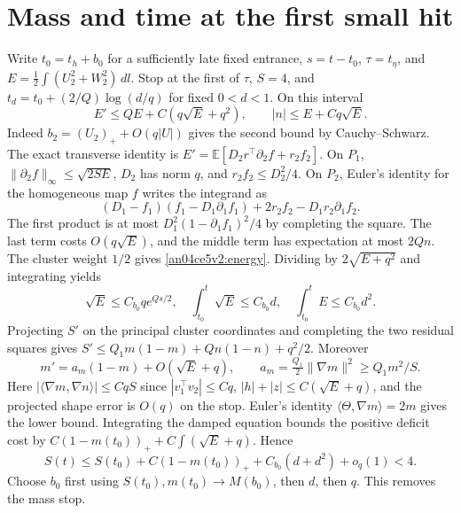 \documentclass[11pt]{article}
\newcommand{\dd}{\,dl}
\newcommand{\E}{\mathbb E}
\begin{document}
\section{Mass and time at the first small hit}\label{an04ce5v2:mass}
Write $t_0=t_h+b_0$ for a sufficiently late fixed entrance, $s=t-t_0$,
$\tau=t_\eta$, and $E=\tfrac12\int (U_2^2+W_2^2)\dd$. Stop at the first of
$\tau$, $S=4$, and $t_d=t_0+(2/Q)\log(d/q)$ for fixed $0<d<1$.
On this interval
\begin{equation}\label{an04ce5v2:energy}
 E'\le QE+C(q\sqrt E+q^2),\qquad |n|\le E+Cq\sqrt E .
\end{equation}
Indeed $b_2=(U_2)_++O(q|U|)$ gives the second bound by Cauchy--Schwarz.
The exact transverse identity is $E'=\E[D_2r^\top\partial_2 f+r_2 f_2]$.
On $P_1$, $\|\partial_2 f\|_\infty\le\sqrt{2SE}$, $D_2$ has norm $q$, and $r_2 f_2\le D_2^2/4$. On $P_2$, Euler's identity for the homogeneous map $f$ writes the integrand as
\[
 (D_1-f_1)(f_1-D_1\partial_1 f_1)+2r_2 f_2-D_1r_2\partial_1 f_2.
\]
The first product is at most $D_1^2(1-\partial_1 f_1)^2/4$ by completing the square. The last term costs $O(q\sqrt E)$, and the middle term has expectation at most $2Qn$. The cluster weight $1/2$ gives \eqref{an04ce5v2:energy}. Dividing by $2\sqrt{E+q^2}$ and integrating yields
\begin{equation}\label{an04ce5v2:envelope}
 \sqrt E\le C_{b_0}q e^{Qs/2},\quad
 \int_{t_0}^t\sqrt E\le C_{b_0}d,\quad \int_{t_0}^t E\le C_{b_0}d^2 .
\end{equation}
Projecting $S'$ on the principal cluster coordinates and completing the two residual squares gives $S'\le Q_1m(1-m)+Qn(1-n)+q^2/2$. Moreover
\[
 m'=a_m(1-m)+O(\sqrt E+q),\qquad
 a_m=\tfrac{Q_1}2\|\nabla m\|^2\ge Q_1m^2/S.
\]
Here $|\langle\nabla m,\nabla n\rangle|\le Cq S$ since $|v_1^\top v_2|\le Cq$, $|h|+|z|\le C(\sqrt E+q)$, and the projected shape error is $O(q)$ on the stop. Euler's identity $\langle\Theta,\nabla m\rangle=2m$ gives the lower bound. Integrating the damped equation bounds the positive deficit cost by $C(1-m(t_0))_++C\int(\sqrt E+q)$. Hence
\[
 S(t)\le S(t_0)+C(1-m(t_0))_++C_{b_0}(d+d^2)+o_q(1)<4 .
\]
Choose $b_0$ first using $S(t_0),m(t_0)\to M(b_0)$, then $d$, then $q$. This removes the mass stop.
\end{document}
